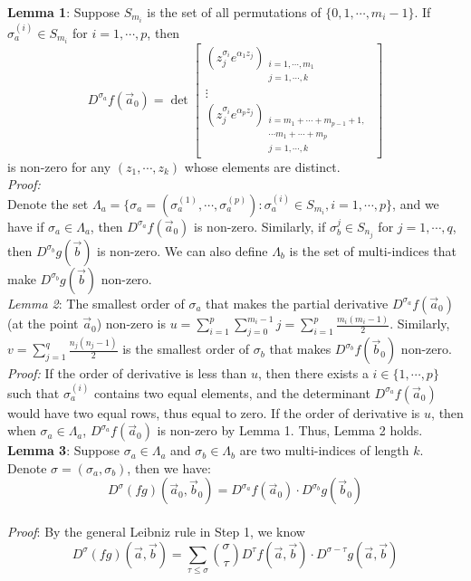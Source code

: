 \documentclass[12pt]{article}
\begin{document}
\textbf{Lemma 1}: Suppose $S_{m_i}$ is the set of all permutations of $\{0,1,\cdots,m_{i}-1\}$. If $\sigma_{a}^{(i)}\in S_{m_i}$ for $i=1,\cdots,p$, then 
\[ D^{\sigma_{a}}f(\vec{a}_{0})= \det
	\left[ \begin{array}{ccc}
		(z_{j}^{\sigma_{i}}e^{\alpha_{1}z_{j}})_{\substack{i=1,\cdots,m_{1}\\j=1,\cdots,k}}\\
	\vdots\\
	(z_{j}^{\sigma_{i}}e^{\alpha_{p}z_{j}})_{\substack{i=m_1+\cdots+m_{p-1}+1,\\ \cdots m_{1}+\cdots +m_{p} \\j=1,\cdots,k}}
	\end{array}
	\right]
\]
is non-zero for any $(z_{1},\cdots,z_{k})$ whose elements are distinct.\\
\emph{Proof: }\\
Denote the set $\Lambda_{a}=\{\sigma_{a}=(\sigma_{a}^{(1)},\cdots,\sigma_{a}^{(p)}):\sigma_{a}^{(i)}\in S_{m_{i}}, i=1,\cdots,p\}$, and we have if $\sigma_{a}\in \Lambda_{a}$, then $D^{\sigma_{a}}f(\vec{a}_{0})$ is non-zero. Similarly, if $\sigma^{j}_{b}\in S_{n_j}$ for $j=1,\cdots,q$, then $D^{\sigma_{b}}g(\vec{b})$ is non-zero. We can also define $\Lambda_{b}$ is the set of multi-indices that make $D^{\sigma_{b}}g(\vec{b})$ non-zero.\\
\emph{Lemma 2}: The smallest order of $\sigma_{a}$ that makes the partial derivative $D^{\sigma_{a}}f(\vec{a}_{0})$(at the point $\vec{a}_{0}$) non-zero is $u=\sum_{i=1}^{p}\sum_{j=0}^{m_{i}-1}j=\sum_{i=1}^{p}\frac{m_{i}(m_{i}-1)}{2}$. Similarly, $v=\sum_{j=1}^{q}\frac{n_{j}(n_{j}-1)}{2}$ is the smallest order of $\sigma_{b}$ that makes $D^{\sigma_{b}}f(\vec{b}_{0})$ non-zero.\\
\emph{Proof:} If the order of derivative is less than $u$, then there exists a $i\in\{1,\cdots,p\}$ such that $\sigma_{a}^{(i)}$ contains two equal elements, and the determinant $D^{\sigma_{a}}f(\vec{a}_{0})$ would have two equal rows, thus equal to zero. If the order of derivative is $u$, then when $\sigma_{a}\in\Lambda_{a}$, $D^{\sigma_{a}}f(\vec{a}_{0})$ is non-zero by Lemma 1. Thus, Lemma 2 holds.\\
\textbf{Lemma 3}: Suppose $\sigma_{a}\in \Lambda_{a}$ and $\sigma_{b}\in \Lambda_{b}$ are two multi-indices of length $k$. Denote $\sigma=(\sigma_{a},\sigma_{b})$, then we have:
$$D^{\sigma}(fg)(\vec{a}_{0},\vec{b}_{0})=D^{\sigma_{a}}f(\vec{a}_{0})\cdot D^{\sigma_{b}}g(\vec{b}_{0})$$ \\
\emph{Proof}: By the general Leibniz rule in Step 1, we know $$D^{\sigma}(fg)(\vec{a},\vec{b})=\sum_{\tau\leqslant\sigma}\binom{\sigma}{\tau}D^{\tau}f(\vec{a},\vec{b})\cdot D^{\sigma-\tau}g(\vec{a},\vec{b})$$
\end{document}
